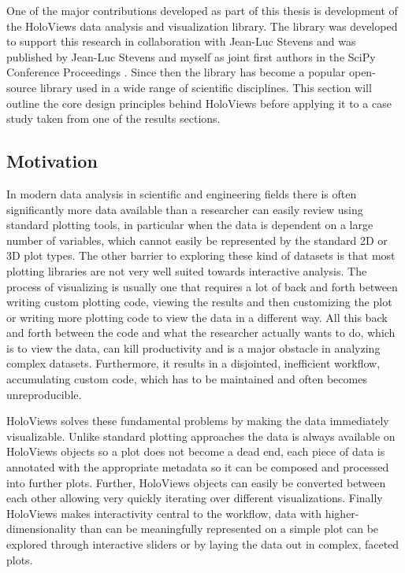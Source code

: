 One of the major contributions developed as part of this thesis is
development of the HoloViews data analysis and visualization library.
The library was developed to support this research in collaboration
with Jean-Luc Stevens and was published by Jean-Luc Stevens and myself
as joint first authors in the SciPy Conference Proceedings
\citep{Stevens2015}. Since then the library has become a popular
open-source library used in a wide range of scientific
disciplines. This section will outline the core design principles
behind HoloViews before applying it to a case study taken from one of
the results sections.

\subsection{Motivation}

In modern data analysis in scientific and engineering fields there is
often significantly more data available than a researcher can easily
review using standard plotting tools, in particular when the data is
dependent on a large number of variables, which cannot easily be
represented by the standard 2D or 3D plot types. The other barrier to
exploring these kind of datasets is that most plotting libraries are
not very well suited towards interactive analysis. The process of
visualizing is usually one that requires a lot of back and forth
between writing custom plotting code, viewing the results and then
customizing the plot or writing more plotting code to view the data in
a different way. All this back and forth between the code and what the
researcher actually wants to do, which is to view the data, can kill
productivity and is a major obstacle in analyzing complex
datasets. Furthermore, it results in a disjointed, inefficient
workflow, accumulating custom code, which has to be maintained and
often becomes unreproducible.

HoloViews solves these fundamental problems by making the data
immediately visualizable. Unlike standard plotting approaches the data
is always available on HoloViews objects so a plot does not become a
dead end, each piece of data is annotated with the appropriate
metadata so it can be composed and processed into further
plots. Further, HoloViews objects can easily be converted between each
other allowing very quickly iterating over different
visualizations. Finally HoloViews makes interactivity central to the
workflow, data with higher-dimensionality than can be meaningfully
represented on a simple plot can be explored through interactive
sliders or by laying the data out in complex, faceted plots.

